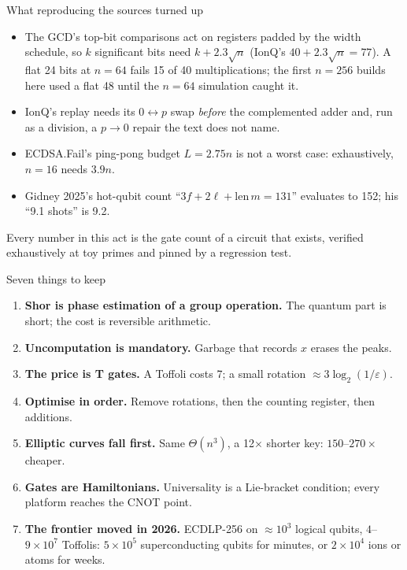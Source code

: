 \documentclass[aspectratio=169,11pt]{beamer}
\begin{document}
\begin{frame}{What reproducing the sources turned up}
  \begin{itemize}\setlength{\itemsep}{1.6mm}
    \item The GCD's top-bit comparisons act on registers padded by the width schedule, so $k$ significant bits need $k+2.3\sqrt n$ (IonQ's $40+2.3\sqrt n=77$). A flat 24 bits at $n=64$ fails 15 of 40 multiplications; the first $n=256$ builds here used a flat 48 until the $n=64$ simulation caught it.
    \item IonQ's replay needs its $0\leftrightarrow p$ swap \emph{before} the complemented adder and, run as a division, a $p\to0$ repair the text does not name.
    \item ECDSA.Fail's ping-pong budget $L=2.75n$ is not a worst case: exhaustively, $n=16$ needs $3.9n$.
    \item Gidney 2025's hot-qubit count ``$3f+2\ell+\mathrm{len}\,m=131$'' evaluates to 152; his ``9.1 shots'' is 9.2.
  \end{itemize}
  \begin{takeaway}Every number in this act is the gate count of a circuit that exists, verified exhaustively at toy primes and pinned by a regression test.\end{takeaway}
\end{frame}

\begin{frame}{Seven things to keep}
  \begin{enumerate}
    \setlength{\itemsep}{1.2mm}
    \item \textbf{Shor is phase estimation of a group operation.} The quantum part is short; the cost is reversible arithmetic.
    \item \textbf{Uncomputation is mandatory.} Garbage that records $x$ erases the peaks.
    \item \textbf{The price is T gates.} A Toffoli costs 7; a small rotation $\approx3\log_2(1/\varepsilon)$.
    \item \textbf{Optimise in order.} Remove rotations, then the counting register, then additions.
    \item \textbf{Elliptic curves fall first.} Same $\Theta(n^3)$, a 12$\times$ shorter key: $150$--$270\times$ cheaper.
    \item \textbf{Gates are Hamiltonians.} Universality is a Lie-bracket condition; every platform reaches the CNOT point.
    \item \textbf{The frontier moved in 2026.} ECDLP-256 on $\approx10^3$ logical qubits, $4$--$9\times10^7$ Toffolis: $5\times10^5$ superconducting qubits for minutes, or $2\times10^4$ ions or atoms for weeks.
  \end{enumerate}
\end{frame}
\end{document}
